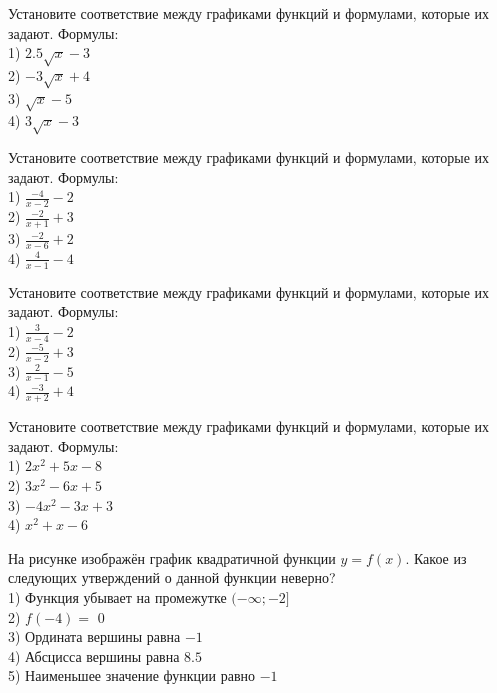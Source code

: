 \documentclass[4apaper]{article}
\begin{document}
\begin{taskBN}{65}
Установите соответствие между графиками функций и формулами, которые их задают. Формулы: \\1) $2.5\sqrt{x}-3$\\2) $-3\sqrt{x}+4$\\3) $\sqrt{x}-5$\\4) $3\sqrt{x}-3$
\end{taskBN}

\begin{taskBN}{66}
Установите соответствие между графиками функций и формулами, которые их задают. Формулы: \\1) $\frac{-4}{x-2}-2$\\2) $\frac{-2}{x+1}+3$\\3) $\frac{-2}{x-6}+2$\\4) $\frac{4}{x-1}-4$
\end{taskBN}

\begin{taskBN}{67}
Установите соответствие между графиками функций и формулами, которые их задают. Формулы: \\1) $\frac{3}{x-4}-2$\\2) $\frac{-5}{x-2}+3$\\3) $\frac{2}{x-1}-5$\\4) $\frac{-3}{x+2}+4$
\end{taskBN}

\begin{taskBN}{68}
Установите соответствие между графиками функций и формулами, которые их задают. Формулы: \\1) $2x^2+5x-8$\\2) $3x^2-6x+5$\\3) $-4x^2-3x+3$\\4) $x^2+x-6$
\end{taskBN}

\begin{taskBN}{69}
На рисунке изображён график квадратичной функции $y=f(x)$. Какое из следующих утверждений о данной функции неверно?\\1) Функция убывает на промежутке $(-\infty;-2]$\\2) $f(-4)=$ $0$\\3) Ордината вершины равна $-1$\\4) Абсцисса вершины равна $8.5$\\5) Наименьшее значение функции равно  $-1$
\end{taskBN}
\end{document}
